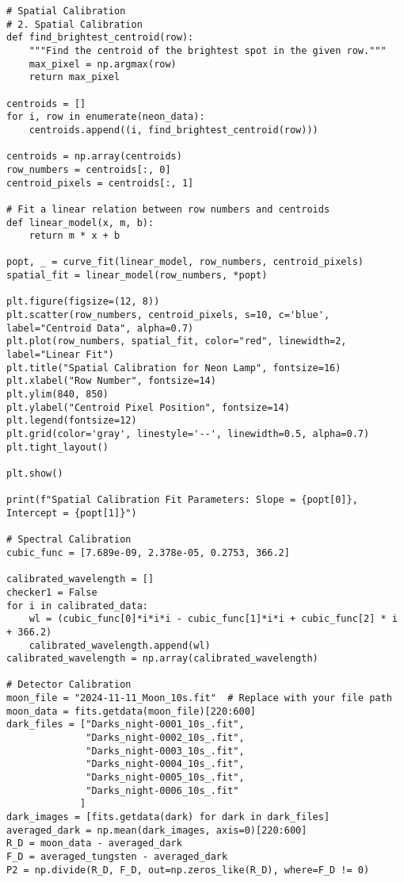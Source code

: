 \documentclass[10pt, preprint]{aastex}
\begin{document}
\begin{verbatim}
# Spatial Calibration
# 2. Spatial Calibration
def find_brightest_centroid(row):
    """Find the centroid of the brightest spot in the given row."""
    max_pixel = np.argmax(row)
    return max_pixel

centroids = []
for i, row in enumerate(neon_data):
    centroids.append((i, find_brightest_centroid(row)))

centroids = np.array(centroids)
row_numbers = centroids[:, 0]
centroid_pixels = centroids[:, 1]

# Fit a linear relation between row numbers and centroids
def linear_model(x, m, b):
    return m * x + b

popt, _ = curve_fit(linear_model, row_numbers, centroid_pixels)
spatial_fit = linear_model(row_numbers, *popt)

plt.figure(figsize=(12, 8))
plt.scatter(row_numbers, centroid_pixels, s=10, c='blue', label="Centroid Data", alpha=0.7)
plt.plot(row_numbers, spatial_fit, color="red", linewidth=2, label="Linear Fit")
plt.title("Spatial Calibration for Neon Lamp", fontsize=16)
plt.xlabel("Row Number", fontsize=14)
plt.ylim(840, 850)
plt.ylabel("Centroid Pixel Position", fontsize=14)
plt.legend(fontsize=12)
plt.grid(color='gray', linestyle='--', linewidth=0.5, alpha=0.7)
plt.tight_layout()

plt.show()

print(f"Spatial Calibration Fit Parameters: Slope = {popt[0]}, Intercept = {popt[1]}")

# Spectral Calibration
cubic_func = [7.689e-09, 2.378e-05, 0.2753, 366.2]

calibrated_wavelength = []
checker1 = False
for i in calibrated_data:
    wl = (cubic_func[0]*i*i*i - cubic_func[1]*i*i + cubic_func[2] * i + 366.2)
    calibrated_wavelength.append(wl)
calibrated_wavelength = np.array(calibrated_wavelength)

# Detector Calibration
moon_file = "2024-11-11_Moon_10s.fit"  # Replace with your file path
moon_data = fits.getdata(moon_file)[220:600]
dark_files = ["Darks_night-0001_10s_.fit", 
              "Darks_night-0002_10s_.fit",
              "Darks_night-0003_10s_.fit",
              "Darks_night-0004_10s_.fit",
              "Darks_night-0005_10s_.fit",
              "Darks_night-0006_10s_.fit"
             ] 
dark_images = [fits.getdata(dark) for dark in dark_files]
averaged_dark = np.mean(dark_images, axis=0)[220:600]
R_D = moon_data - averaged_dark
F_D = averaged_tungsten - averaged_dark
P2 = np.divide(R_D, F_D, out=np.zeros_like(R_D), where=F_D != 0)
\end{verbatim}
\end{document}
